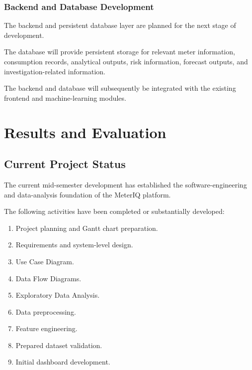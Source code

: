 \documentclass{tietreport}
\begin{document}
\subsection{Backend and Database Development}

The backend and persistent database layer are planned for the next stage of
development.

The database will provide persistent storage for relevant meter information,
consumption records, analytical outputs, risk information, forecast outputs,
and investigation-related information.

The backend and database will subsequently be integrated with the existing
frontend and machine-learning modules.


\chapter{Results and Evaluation}

\section{Current Project Status}

The current mid-semester development has established the software-engineering
and data-analysis foundation of the MeterIQ platform.

The following activities have been completed or substantially developed:

\begin{enumerate}
    \item Project planning and Gantt chart preparation.
    \item Requirements and system-level design.
    \item Use Case Diagram.
    \item Data Flow Diagrams.
    \item Exploratory Data Analysis.
    \item Data preprocessing.
    \item Feature engineering.
    \item Prepared dataset validation.
    \item Initial dashboard development.
\end{enumerate}
\end{document}
